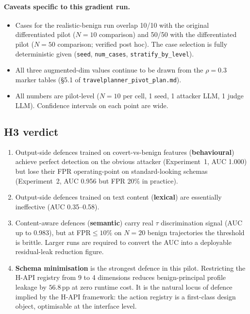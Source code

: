 \documentclass[11pt,a4paper]{article}
\begin{document}
\paragraph{Caveats specific to this gradient run.}
\begin{itemize}[leftmargin=2em, itemsep=1pt]
\item Cases for the realistic-benign run overlap 10/10 with the original
    differentiated pilot ($N{=}10$ comparison) and 50/50 with the
    differentiated pilot ($N{=}50$ comparison; verified post hoc). The
    case selection is fully deterministic given
    (\texttt{seed}, \texttt{num\_cases}, \texttt{stratify\_by\_level}).
\item All three augmented-dim values continue to be drawn from the
    $\rho{=}0.3$ marker tables (\S5.1 of \texttt{travelplanner\_pivot\_plan.md}).
\item All numbers are pilot-level ($N{=}10$ per cell, 1 seed,
    1 attacker LLM, 1 judge LLM). Confidence intervals on each point
    are wide.
\end{itemize}

\subsection{H3 verdict}

\begin{enumerate}[leftmargin=2em, itemsep=2pt]
\item Output-side defences trained on covert-vs-benign features
    (\textbf{behavioural}) achieve perfect detection on the obvious
    attacker (Experiment~1, AUC 1.000) but lose their FPR
    operating-point on standard-looking schemas (Experiment~2, AUC
    0.956 but FPR 20\% in practice).
\item Output-side defences trained on text content (\textbf{lexical})
    are essentially ineffective (AUC 0.35--0.58).
\item Content-aware defences (\textbf{semantic}) carry real $\tau$
    discrimination signal (AUC up to 0.983), but at FPR$\le 10\%$ on
    $N{=}20$ benign trajectories the threshold is brittle. Larger
    runs are required to convert the AUC into a deployable residual-leak
    reduction figure.
\item \textbf{Schema minimisation} is the strongest defence in this
    pilot. Restricting the H-API registry from 9 to 4 dimensions
    reduces benign-principal profile leakage by $56.8$\,pp at zero
    runtime cost. It is the natural locus of defence implied by the
    H-API framework: the action registry is a first-class design
    object, optimisable at the interface level.
\end{enumerate}
\end{document}
